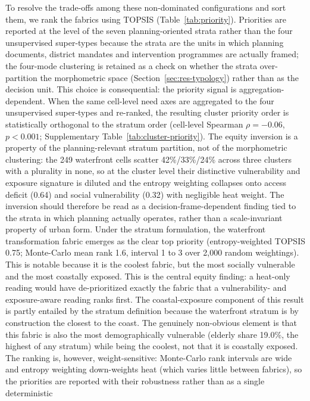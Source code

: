 To resolve the trade-offs among these non-dominated configurations and sort them,
we rank the fabrics using TOPSIS (Table~\ref{tab:priority}). Priorities are reported
at the level of the seven planning-oriented strata rather than the four
unsupervised super-types because the strata are the units in which planning
documents, district mandates and intervention programmes are actually framed; the
four-mode clustering is retained as a check on whether the strata over-partition the
morphometric space (Section~\ref{sec:res-typology}) rather than as the decision unit. This choice is consequential:
the priority signal is aggregation-dependent. When the same cell-level need axes are aggregated to the four
unsupervised super-types and re-ranked, the resulting cluster priority order is statistically
orthogonal to the stratum order (cell-level Spearman $\rho = -0.06$, $p < 0.001$; Supplementary
Table~\ref{tab:cluster-priority}). The equity inversion is a property of the planning-relevant stratum
partition, not of the morphometric clustering: the 249 waterfront cells scatter 42\%/33\%/24\% across three
clusters with a plurality in none, so at the cluster level their distinctive vulnerability and exposure signature is
diluted and the entropy weighting collapses onto access deficit (0.64) and social vulnerability (0.32) with
negligible heat weight. The inversion should therefore be read as a decision-frame-dependent finding tied to the
strata in which planning actually operates, rather than a scale-invariant property of urban form. Under the
stratum formulation, the
waterfront transformation fabric emerges as the clear top priority (entropy-weighted
TOPSIS 0.75; Monte-Carlo mean rank 1.6, interval 1 to 3 over 2{,}000 random weightings). This is notable
because it is the coolest fabric, but the most socially vulnerable and the most
coastally exposed. This is the central equity finding: a heat-only reading would have
de-prioritized exactly the fabric that a vulnerability- and exposure-aware reading
ranks first. The coastal-exposure component of this result is partly entailed by the
stratum definition because the waterfront stratum is by construction the closest to the
coast. The genuinely non-obvious element is that this fabric is also the most
demographically vulnerable (elderly share 19.0\%, the highest of any stratum) while
being the coolest, not that it is coastally exposed.
The ranking is, however, weight-sensitive: Monte-Carlo rank intervals are wide and 
entropy weighting down-weights heat (which varies little between fabrics), so the 
priorities are reported with their robustness rather than as a single deterministic 
